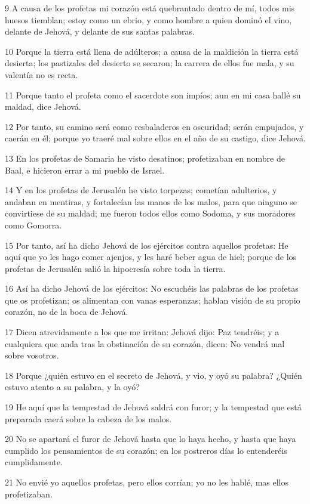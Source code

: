 \par 9 A causa de los profetas mi corazón está quebrantado dentro de mí, todos mis huesos tiemblan; estoy como un ebrio, y como hombre a quien dominó el vino, delante de Jehová, y delante de sus santas palabras.
\par 10 Porque la tierra está llena de adúlteros; a causa de la maldición la tierra está desierta; los pastizales del desierto se secaron; la carrera de ellos fue mala, y su valentía no es recta.
\par 11 Porque tanto el profeta como el sacerdote son impíos; aun en mi casa hallé su maldad, dice Jehová.
\par 12 Por tanto, su camino será como resbaladeros en oscuridad; serán empujados, y caerán en él; porque yo traeré mal sobre ellos en el año de su castigo, dice Jehová.
\par 13 En los profetas de Samaria he visto desatinos; profetizaban en nombre de Baal, e hicieron errar a mi pueblo de Israel.
\par 14 Y en los profetas de Jerusalén he visto torpezas; cometían adulterios, y andaban en mentiras, y fortalecían las manos de los malos, para que ninguno se convirtiese de su maldad; me fueron todos ellos como Sodoma, y sus moradores como Gomorra.
\par 15 Por tanto, así ha dicho Jehová de los ejércitos contra aquellos profetas: He aquí que yo les hago comer ajenjos, y les haré beber agua de hiel; porque de los profetas de Jerusalén salió la hipocresía sobre toda la tierra.
\par 16 Así ha dicho Jehová de los ejércitos: No escuchéis las palabras de los profetas que os profetizan; os alimentan con vanas esperanzas; hablan visión de su propio corazón, no de la boca de Jehová.
\par 17 Dicen atrevidamente a los que me irritan: Jehová dijo: Paz tendréis; y a cualquiera que anda tras la obstinación de su corazón, dicen: No vendrá mal sobre vosotros.
\par 18 Porque ¿quién estuvo en el secreto de Jehová, y vio, y oyó su palabra? ¿Quién estuvo atento a su palabra, y la oyó?
\par 19 He aquí que la tempestad de Jehová saldrá con furor; y la tempestad que está preparada caerá sobre la cabeza de los malos.
\par 20 No se apartará el furor de Jehová hasta que lo haya hecho, y hasta que haya cumplido los pensamientos de su corazón; en los postreros días lo entenderéis cumplidamente.
\par 21 No envié yo aquellos profetas, pero ellos corrían; yo no les hablé, mas ellos profetizaban.
